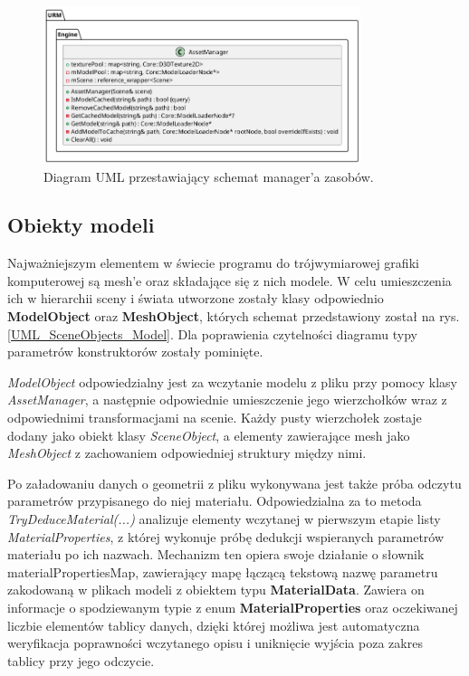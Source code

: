	\begin{figure}[h!]
		\centering
		\includegraphics[width=350px]{images/UML/assets.png}
		\caption{Diagram UML przestawiający schemat manager'a zasobów.}
		\label{UML_AssetManager}
	\end{figure}
	
	
\subsection{Obiekty modeli}
	Najważniejszym elementem w świecie programu do trójwymiarowej grafiki komputerowej są mesh'e oraz składające się z nich modele. W celu umieszczenia ich w hierarchii sceny i świata utworzone zostały klasy odpowiednio \textbf{ModelObject} oraz \textbf{MeshObject}, których schemat przedstawiony został na rys. \ref{UML_SceneObjects_Model}. Dla poprawienia czytelności diagramu typy parametrów konstruktorów zostały pominięte.
	
	\textit{ModelObject} odpowiedzialny jest za wczytanie modelu z pliku przy pomocy klasy \textit{AssetManager}, a następnie odpowiednie umieszczenie jego wierzchołków wraz z odpowiednimi transformacjami na scenie. Każdy pusty wierzchołek zostaje dodany jako obiekt klasy \textit{SceneObject}, a elementy zawierające mesh jako \textit{MeshObject} z zachowaniem odpowiedniej struktury między nimi.
	
	Po załadowaniu danych o geometrii z pliku wykonywana jest także próba odczytu parametrów przypisanego do niej materiału. Odpowiedzialna za to metoda \textit{TryDeduceMaterial(...)} analizuje elementy wczytanej w pierwszym etapie listy \textit{MaterialProperties}, z której wykonuje próbę dedukcji wspieranych parametrów materiału po ich nazwach. Mechanizm ten opiera swoje działanie o słownik materialPropertiesMap, zawierający mapę łączącą tekstową nazwę parametru zakodowaną w plikach modeli z obiektem typu \textbf{MaterialData}. Zawiera on informacje o spodziewanym typie z enum \textbf{MaterialProperties} oraz oczekiwanej liczbie elementów tablicy danych, dzięki której możliwa jest automatyczna weryfikacja poprawności wczytanego opisu i uniknięcie wyjścia poza zakres tablicy przy jego odczycie.
	
